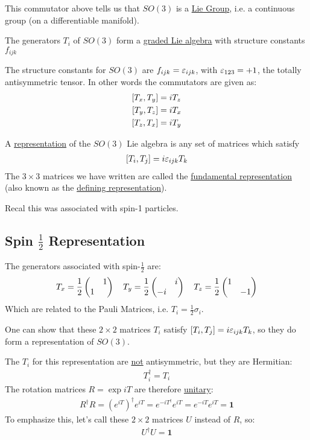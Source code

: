 This commutator above tells us that $SO(3)$ is a \underline{Lie Group}, i.e. a continuous group (on a differentiable manifold).

The generators $T_i$ of $SO(3)$ form a \underline{graded Lie algebra} with structure constants $f_{ijk}$

The structure constants for $SO(3)$ are $f_{ijk}=\varepsilon_{ijk}$, with $\varepsilon_{123}=+1$, the totally antisymmetric tensor. In other words the commutators are given as:
\begin{align*}
  \comm{T_x}{T_y}&=iT_z\\
  \comm{T_y}{T_z}&=iT_x\\
  \comm{T_z}{T_x}&=iT_y
\end{align*}

A \underline{representation} of the $SO(3)$ Lie algebra is any set of matrices which satisfy
\begin{align*}
  \comm{T_i}{T_j}=i\veps_{ijk}T_k
\end{align*}
The $3\times 3$ matrices we have written are called the \underline{fundamental representation} (also known as the \underline{defining representation}).

Recal this was associated with spin-1 particles.

\subsection{Spin $\frac12$ Representation}
The generators associated with spin-$\frac12$ are:
\begin{align*}
  T_x=\frac12\pmqty{&1\\1&}\quad
  T_y=\frac12\pmqty{&i\\-i&}\quad
  T_z=\frac12\pmqty{1& \\ &-1}
\end{align*}
Which are related to the Pauli Matrices, i.e. $T_i=\frac12\sigma_i$.

One can show that these $2\times 2$ matrices $T_i$ satisfy $\comm{T_i}{T_j}=i\veps_{ijk}T_k$, so they do form a representation of $SO(3)$.

The $T_i$ for this representation are \underline{not} antisymmetric, but they are Hermitian:
\begin{align*}
  T_i^\dag=T_i
\end{align*}
The rotation matrices $R=\exp{iT}$ are therefore \underline{unitary}:
\begin{align*}
  R^\dag R=(e^{iT})^\dag e^{iT}=e^{-iT^\dag}e^{iT}=e^{-iT}e^{iT}=\bm{1}
\end{align*}
To emphasize this, let's call these $2\times2$ matrices $U$ instead of $R$, so:
\begin{align*}
  U^\dag U=\bm{1}
\end{align*}

